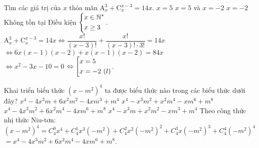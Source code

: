 \begin{ex}%
	Tìm các giá trị của $x$ thỏa mãn $\mathrm{A}_x^3+\mathrm{C}_x^{x-3}=14x$.
	\choice
	{\True $x=5$}
	{$x=5$ và $x=-2$}
	{$x=-2$}
	{Không tồn tại}
	\loigiai
	{Điều kiện $\left\{\begin{aligned}
			& x\in \mathbb{N^*} \\
			& x\ge 3 \\
		\end{aligned}\right.$.\\
		$\mathrm{A}_x^3+\mathrm{C}_x^{x-3}=14x\Leftrightarrow \dfrac{x!}{\left( x-3 \right)!}+\dfrac{x!}{\left( x-3 \right)!\cdot  3!}=14x$
		$\Leftrightarrow 6x\left( x-1 \right)\left( x-2 \right)+x\left( x-1 \right)\left( x-2 \right)=84x$\\
		$\Leftrightarrow x^2-3x-10=0$ $\Leftrightarrow \left[\begin{aligned}
			& x=5 \\
			& x=-2\,\left( l \right) \\
		\end{aligned}\right.$.}
\end{ex}

\begin{ex}%
	Khai triển biểu thức ${\left( x-{m^2} \right)}^4$ ta được biểu thức nào trong các biểu thức dưới đây?
	\choice
	{$x^4-4x^3m+6x^2m^2-4xm^3+m^4$}
	{$x^4-x^3m^2+x^2m^4-xm^6+m^8$}
	{ \True $x^4-4x^3m^2+6x^2m^4-4xm^6+m^8$}
	{$x^4-x^3m+x^2m^2-xm^3+m^4$}
	\loigiai
	{Theo công thức nhị thức Niu-tơn:\\
		$(x-m^2)^4=C_4^0x^4+C_4^1x^3(-m^2)+C_4^2x^2(-m^2)^2+C_{4}^3x(-m^2)^3+C_4^4(-m^2)^4$\\
		$=x^4-4x^3m^2+6x^2m^4-4xm^6+m^8$.}
\end{ex}

